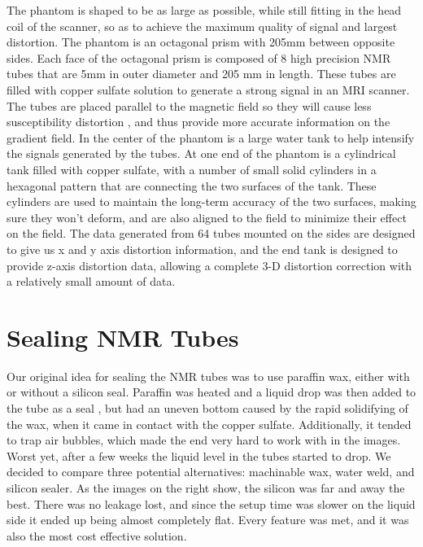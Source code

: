 The phantom is shaped to be as large as possible, while still fitting in the head coil of the scanner, so as
to achieve the maximum quality of signal and largest distortion. The phantom is an octagonal prism with 205mm
between opposite sides.  Each face of the octagonal prism is composed of 8 high precision NMR tubes that are
5mm in outer diameter and 205 mm in length. These tubes are filled with copper sulfate solution to generate a
strong signal in an MRI scanner.  The tubes are placed parallel to the magnetic field so they will cause less
susceptibility distortion \cite{mag_susceptibility},
and thus provide more accurate information on the gradient field.  In the
center of the phantom is a large water tank to help intensify the signals generated by the tubes. At one end
of the phantom is a cylindrical tank filled with copper sulfate, with a number of small solid cylinders in a
hexagonal pattern that are connecting the two surfaces of the tank. These cylinders are used to maintain the
long-term accuracy of the two surfaces, making sure they won’t deform, and are also aligned to the field to
minimize their effect on the field.  The data generated from 64 tubes mounted on the sides are designed to
give us x and y axis distortion information, and the end tank is designed to provide z-axis distortion data,
allowing a complete 3-D distortion correction with a relatively small amount of data.

\section{Sealing NMR Tubes}

Our original idea for sealing the NMR tubes was to use paraffin wax, either with or without a silicon seal.
Paraffin was heated and a liquid drop was then added to the tube as a seal , but had an uneven bottom caused
by the rapid solidifying of the wax, when it came in contact with the copper sulfate.  Additionally,
it tended to trap air bubbles, which made the end very hard to work with in the images.  Worst yet, after a
few weeks the liquid level in the tubes started to drop.  We decided to compare three potential alternatives:
machinable wax, water weld, and silicon sealer.  As the images on the right show, the silicon was far and
away the best.  There was no leakage lost, and since the setup time was slower on the liquid side it ended
up being almost completely flat.  Every feature was met, and it was also the most cost effective solution.

